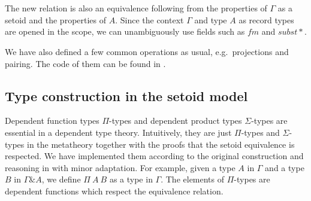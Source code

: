 \begin{code}
\\
\>[0]\<[19]%
\>[19]\AgdaFunction{[}  \AgdaSymbol{\_} \AgdaFunction{]trans} \AgdaSymbol{(}\AgdaFunction{[}  \AgdaSymbol{\_} \AgdaFunction{]trans} \<[48]%
\>[48]\<%
\\
\>[0]\<[19]%
\>[19]\AgdaSymbol{(}\AgdaFunction{[}  \AgdaSymbol{\_} \AgdaFunction{]sym} \AgdaSymbol{(} \AgdaSymbol{\_))} \AgdaSymbol{(} \AgdaSymbol{\_} \AgdaSymbol{))} \AgdaSymbol{\}}\<%
\\
\>[0]\<[9]%
\>[9]\AgdaSymbol{\}}\<%
\\
\>[0]\<[4]%
\>[4]\<%
\\
\>[4]\<[6]%
\>[6]  \<%
\\
\>[4]\<[6]%
\>[6]  \<%
\\
\end{code}

The new relation is also an equivalence following from the properties of $\Gamma$ as a setoid and the properties of $A$.
Since the context $\Gamma$ and type $A$ as record types are opened in the scope, we can unambiguously use fields such as $fm$ and $subst*$.

We have also defined a few common operations as usual, e.g.\ projections and pairing. The code of them can be found in .

\subsection{Type construction in the setoid model}

Dependent function types $\Pi$-types and dependent product types $\Sigma$-types are essential in a dependent type theory. Intuitively, they are just $\Pi$-types and $\Sigma$-types in the metatheory together with the proofs that the setoid equivalence is respected. We have implemented them according to the original construction and reasoning in \cite{alti:lics99} with minor adaptation.
For example, given a type $A$ in $\Gamma$ and a type $B$ in $\Gamma \& A$, we define $\Pi ~A ~B$ as a type in $\Gamma$. 
The elements of $\Pi$-types are dependent functions which respect the equivalence relation.

